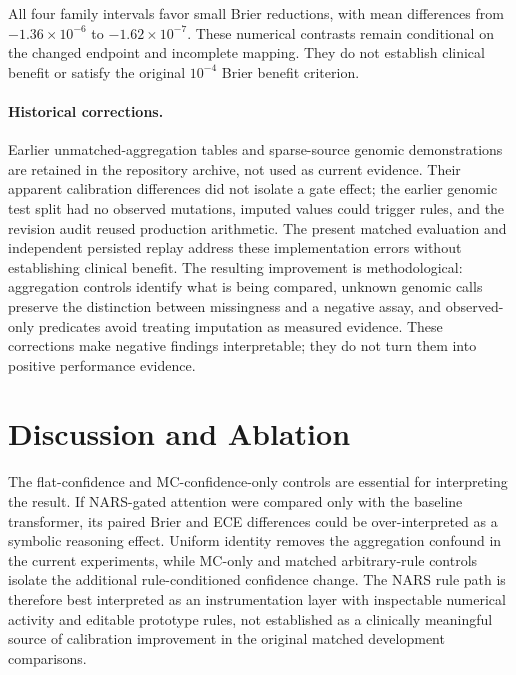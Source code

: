 \documentclass{article}
\begin{document}


All four family intervals favor small Brier reductions, with mean differences from $-1.36\times10^{-6}$ to $-1.62\times10^{-7}$. These numerical contrasts remain conditional on the changed endpoint and incomplete mapping. They do not establish clinical benefit or satisfy the original $10^{-4}$ Brier benefit criterion.

\paragraph{Historical corrections.} Earlier unmatched-aggregation tables and sparse-source genomic demonstrations are retained in the repository archive, not used as current evidence. Their apparent calibration differences did not isolate a gate effect; the earlier genomic test split had no observed mutations, imputed values could trigger rules, and the revision audit reused production arithmetic. The present matched evaluation and independent persisted replay address these implementation errors without establishing clinical benefit. The resulting improvement is methodological: aggregation controls identify what is being compared, unknown genomic calls preserve the distinction between missingness and a negative assay, and observed-only predicates avoid treating imputation as measured evidence. These corrections make negative findings interpretable; they do not turn them into positive performance evidence.

\section{Discussion and Ablation}
\label{sec:analysis}

The flat-confidence and MC-confidence-only controls are essential for interpreting the result. If NARS-gated attention were compared only with the baseline transformer, its paired Brier and ECE differences could be over-interpreted as a symbolic reasoning effect. Uniform identity removes the aggregation confound in the current experiments, while MC-only and matched arbitrary-rule controls isolate the additional rule-conditioned confidence change. The NARS rule path is therefore best interpreted as an instrumentation layer with inspectable numerical activity and editable prototype rules, not established as a clinically meaningful source of calibration improvement in the original matched development comparisons.
\end{document}
